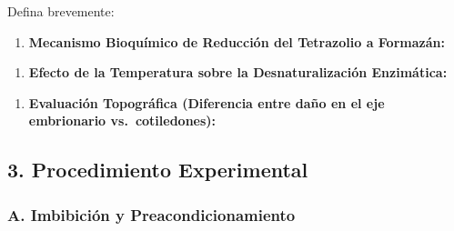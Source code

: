 \documentclass[
  spanish,
  10pt,
  letterpaper,
  twocolumn]{article}
\providecommand{\tightlist}{%
  \setlength{\itemsep}{0pt}\setlength{\parskip}{0pt}}
\begin{document}
Defina brevemente:

\begin{enumerate}
\def\labelenumi{\arabic{enumi}.}
\tightlist
\item
  \textbf{Mecanismo Bioquímico de Reducción del Tetrazolio a Formazán:}
\end{enumerate}

\hrulefill

\hrulefill

\hrulefill

\hrulefill

\hrulefill

\hrulefill

\begin{enumerate}
\def\labelenumi{\arabic{enumi}.}
\setcounter{enumi}{1}
\tightlist
\item
  \textbf{Efecto de la Temperatura sobre la Desnaturalización
  Enzimática:}
\end{enumerate}

\hrulefill

\hrulefill

\hrulefill

\hrulefill

\hrulefill

\hrulefill

\begin{enumerate}
\def\labelenumi{\arabic{enumi}.}
\setcounter{enumi}{2}
\tightlist
\item
  \textbf{Evaluación Topográfica (Diferencia entre daño en el eje
  embrionario vs.~cotiledones):}
\end{enumerate}

\hrulefill

\hrulefill

\hrulefill

\hrulefill

\hrulefill

\hrulefill

\subsection{3. Procedimiento
Experimental}\label{procedimiento-experimental}

\subsubsection{A. Imbibición y
Preacondicionamiento}\label{a.-imbibiciuxf3n-y-preacondicionamiento}
\end{document}
